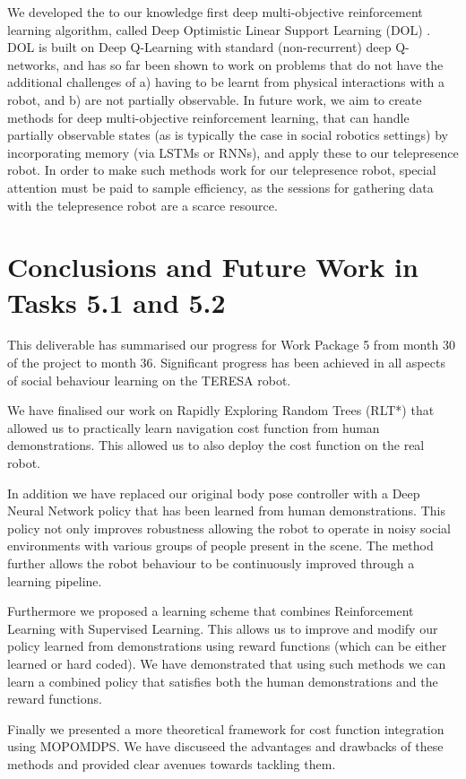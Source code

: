 \documentclass[a4paper,11pt]{report}
\begin{document}
We developed the to our knowledge first deep multi-objective reinforcement learning algorithm, called Deep Optimistic Linear Support Learning (DOL) \cite{hossam2016}. DOL is built on Deep Q-Learning with standard (non-recurrent) deep Q-networks, and has so far been shown to work on problems that do not have the additional challenges of a) having to be learnt from physical interactions with a robot, and b) are not partially observable. In future work, we aim to create methods for deep multi-objective reinforcement learning, that can handle partially observable states (as is typically the case in social robotics settings) by incorporating memory (via LSTMs or RNNs), and apply these to our telepresence robot. In order to make such methods work for our telepresence robot, special attention must be paid to sample efficiency, as the sessions for gathering data with the telepresence robot are a scarce resource. 

\section{Conclusions and Future Work in Tasks 5.1 and 5.2}
\label{sec:conclusions}
This deliverable has summarised our progress for Work Package 5 from month 30 of the project to month 36. Significant progress has been achieved in all aspects of social behaviour learning on the TERESA robot. 

We have finalised our work on Rapidly Exploring Random Trees (RLT*) that allowed us to practically learn navigation cost function from human demonstrations. This allowed us to also deploy the cost function on the real robot.

In addition we have replaced our original body pose controller with a Deep Neural Network policy that has been learned from human demonstrations. This policy not only improves robustness allowing the robot to operate in noisy social environments with various groups of people present in the scene. The method further allows the robot behaviour to be continuously improved through a learning pipeline.

Furthermore we proposed a learning scheme that combines Reinforcement Learning with Supervised Learning. This allows us to improve and modify our policy learned from demonstrations using reward functions (which can be either learned or hard coded). We have demonstrated that using such methods we can learn a combined policy that satisfies both the human demonstrations and the reward functions.

Finally we presented a more theoretical framework for cost function integration using MOPOMDPS. We have discuseed the advantages and drawbacks of these methods and provided clear avenues towards tackling them. 


\end{document}
